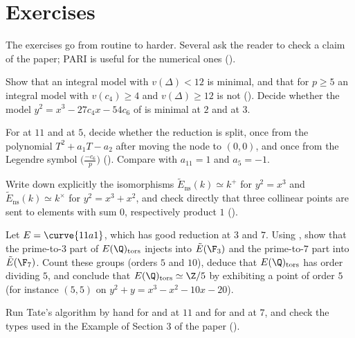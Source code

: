 \section{Exercises}\label{sec:reduction:exercises}

The exercises go from routine to harder. Several ask the reader to check a claim of the paper; PARI is useful for the
numerical ones ().

\begin{exercise}\label{exer:reduction:minimal}
Show that an integral model with $v(\Delta)<12$ is minimal, and that for $p\ge5$ an integral model with $v(c_4)\ge4$ and
$v(\Delta)\ge12$ is not (). Decide whether the model $y^2=x^3-27c_4x-54c_6$ of  is minimal at
$2$ and at $3$.
\end{exercise}

\begin{exercise}\label{exer:reduction:split}
For  at $11$ and  at $5$, decide whether the reduction is split, once from the polynomial $T^2+a_1T-a_2$ after moving
the node to $(0,0)$, and once from the Legendre symbol $\bigl(\frac{-c_6}{p}\bigr)$ (). Compare with $a_{11}=1$ and
$a_5=-1$.
\end{exercise}

\begin{exercise}\label{exer:reduction:Ens}
Write down explicitly the isomorphisms $\tilde E_{\mathrm{ns}}(k)\simeq k^+$ for $y^2=x^3$ and $\tilde E_{\mathrm{ns}}(k)\simeq k^\times$ for
$y^2=x^3+x^2$, and check directly that three collinear points are sent to elements with sum $0$, respectively product $1$
().
\end{exercise}

\begin{exercise}\label{exer:reduction:torsion}
Let $E=\curve{11a1}$, which has good reduction at $3$ and $7$. Using , show that the prime-to-$3$
part of $E(\Q)_{\mathrm{tors}}$ injects into $\tilde E(\F_3)$ and the prime-to-$7$ part into $\tilde E(\F_7)$. Count these groups (orders $5$
and $10$), deduce that $E(\Q)_{\mathrm{tors}}$ has order dividing $5$, and conclude that $E(\Q)_{\mathrm{tors}}\simeq\Z/5$ by exhibiting a point
of order $5$ (for instance $(5,5)$ on $y^2+y=x^3-x^2-10x-20$).
\end{exercise}

\begin{exercise}\label{exer:reduction:tate-hand}
Run Tate's algorithm by hand for  and  at $11$ and for  and  at $7$, and check the types
used in the Example of Section 3 of the paper ().
\end{exercise}

